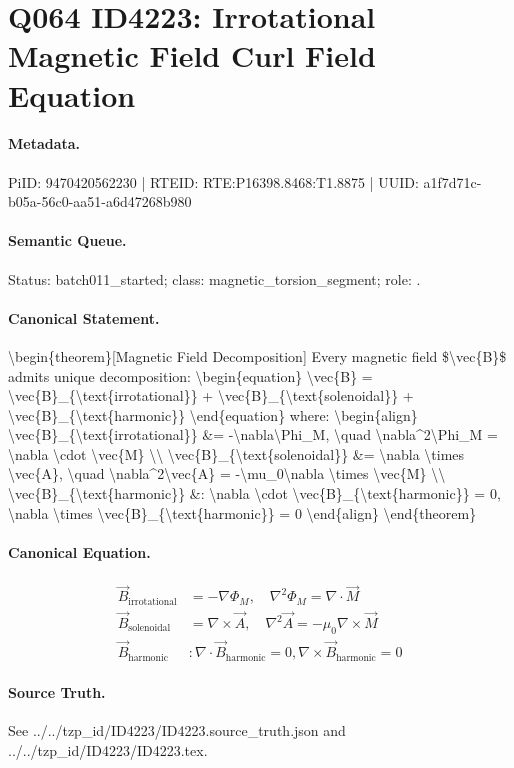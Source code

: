 \section*{Q064 ID4223: Irrotational Magnetic Field Curl Field Equation}
\paragraph{Metadata.}
PiID: 9470420562230 | RTEID: RTE:P16398.8468:T1.8875 | UUID: a1f7d71c-b05a-56c0-aa51-a6d47268b980

\paragraph{Semantic Queue.}
Status: batch011\_started; class: magnetic\_torsion\_segment; role: .

\paragraph{Canonical Statement.}
\textbackslash{}begin\{theorem\}[Magnetic Field Decomposition] Every magnetic field \$\textbackslash{}vec\{B\}\$ admits unique decomposition: \textbackslash{}begin\{equation\} \textbackslash{}vec\{B\} = \textbackslash{}vec\{B\}\_\{\textbackslash{}text\{irrotational\}\} + \textbackslash{}vec\{B\}\_\{\textbackslash{}text\{solenoidal\}\} + \textbackslash{}vec\{B\}\_\{\textbackslash{}text\{harmonic\}\} \textbackslash{}end\{equation\} where: \textbackslash{}begin\{align\} \textbackslash{}vec\{B\}\_\{\textbackslash{}text\{irrotational\}\} \&= -\textbackslash{}nabla\textbackslash{}Phi\_M, \textbackslash{}quad \textbackslash{}nabla\textasciicircum{}2\textbackslash{}Phi\_M = \textbackslash{}nabla \textbackslash{}cdot \textbackslash{}vec\{M\} \textbackslash{}\textbackslash{} \textbackslash{}vec\{B\}\_\{\textbackslash{}text\{solenoidal\}\} \&= \textbackslash{}nabla \textbackslash{}times \textbackslash{}vec\{A\}, \textbackslash{}quad \textbackslash{}nabla\textasciicircum{}2\textbackslash{}vec\{A\} = -\textbackslash{}mu\_0\textbackslash{}nabla \textbackslash{}times \textbackslash{}vec\{M\} \textbackslash{}\textbackslash{} \textbackslash{}vec\{B\}\_\{\textbackslash{}text\{harmonic\}\} \&: \textbackslash{}nabla \textbackslash{}cdot \textbackslash{}vec\{B\}\_\{\textbackslash{}text\{harmonic\}\} = 0, \textbackslash{}nabla \textbackslash{}times \textbackslash{}vec\{B\}\_\{\textbackslash{}text\{harmonic\}\} = 0 \textbackslash{}end\{align\} \textbackslash{}end\{theorem\}

\paragraph{Canonical Equation.}
\[
\begin{align} \vec{B}_{\text{irrotational}} &= -\nabla\Phi_M, \quad \nabla^2\Phi_M = \nabla \cdot \vec{M} \\ \vec{B}_{\text{solenoidal}} &= \nabla \times \vec{A}, \quad \nabla^2\vec{A} = -\mu_0\nabla \times \vec{M} \\ \vec{B}_{\text{harmonic}} &: \nabla \cdot \vec{B}_{\text{harmonic}} = 0, \nabla \times \vec{B}_{\text{harmonic}} = 0 \end{align}
\]

\paragraph{Source Truth.}
See ../../tzp\_id/ID4223/ID4223.source\_truth.json and ../../tzp\_id/ID4223/ID4223.tex.
